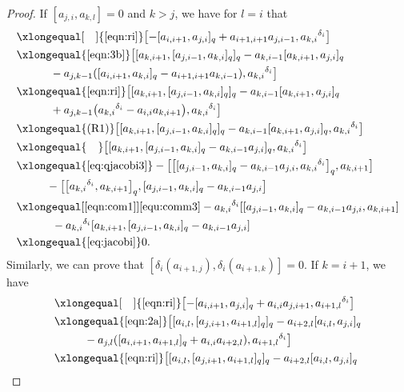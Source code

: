 \documentclass[pdftex]{sigma}
\numberwithin{equation}{section}
\def\lr#1{\left[#1\right]}
\def\d{\delta}
\begin{document}
\begin{proof}
If $\lr{a_{j,i}, a_{k,l}}=0$ and $k>j$, we have for $l=i$ that
 \begin{align*}
 [\d_i (a_{j,i}), \d_i(a_{k,i} ) ] &
 \xlongequal[\quad]{\eqref{eqn:ri}} \bigl[- [a_{i,i+1}, a_{j,i} ]_q+a_{i+1,i+1}a_{j,i-1}, {a_{k,i}}^{\d_i} \bigr] \\
 &\xlongequal{\eqref{eqn:3b}} \bigl[ [a_{k,i+1}, [a_{j,i-1}, a_{k,i} ]_q ]_q -a_{k,i-1} [a_{k,i+1}, a_{j,i} ]_q \\
 &\qquad \quad -a_{j,k-1} ( [a_{i,i+1}, a_{k,i} ]_q-a_{i+1,i+1}a_{k,i-1} ) , {a_{k,i}}^{\d_i} \bigr]\\
& \xlongequal{\eqref{eqn:ri}} \bigl[ [a_{k,i+1}, [a_{j,i-1}, a_{k,i} ]_q ]_q-a_{k,i-1} [a_{k,i+1}, a_{j,i} ]_q \\
 &\qquad \quad +a_{j,k-1} \bigl({a_{k,i}}^{\d_i}-a_{i,i}a_{k,i+1} \bigr) , {a_{k,i}}^{\d_i} \bigr] \\
 &\xlongequal{(\textrm{R1})} \bigl[ [a_{k,i+1}, [a_{j,i-1}, a_{k,i} ]_q ]_q-a_{k,i-1} [a_{k,i+1}, a_{j,i} ]_q, {a_{k,i}}^{\d_i} \bigr] \\
 & \xlongequal{\quad} \bigl[ [a_{k,i+1}, [a_{j,i-1}, a_{k,i} ]_q-a_{k,i-1}a_{j,i} ]_q, {a_{k,i}}^{\d_i} \bigr] \\
 &\xlongequal{\eqref{eq:qjacobi3}} - \bigl[ \bigl[ [a_{j,i-1}, a_{k,i} ]_q- a_{k,i-1}a_{j,i}, {a_{k,i}}^{\d_i} \bigr]_q, a_{k,i+1} \bigr] \\
 &\qquad\ \ - \bigl[ \bigl[{a_{k,i}}^{\d_i}, a_{k,i+1} \bigr]_q, [a_{j,i-1}, a_{k,i} ]_q-a_{k,i-1}a_{j,i} \bigr] \\
 &\xlongequal[\eqref{eqn:com1}]{\eqref{equ:comm3}} -{a_{k,i}}^{\d_i} [ [a_{j,i-1}, a_{k,i} ]_q-a_{k,i-1}a_{j,i}, a_{k,i+1} ] \\
 &\qquad\quad \, -{a_{k,i}}^{\d_i} [a_{k,i+1}, [a_{j,i-1}, a_{k,i} ]_q-a_{k,i-1}a_{j,i} ] \\
 &\xlongequal{\eqref{eq:jacobi}} 0.
 \end{align*}
Similarly, we can prove that
$[\d_i(a_{i+1,j}), \d_i(a_{i+1,k}) ]=0$.
If $k=i+1$, we have
 \begin{align*}
 [\d_i(a_{j,i}), \d_i(a_{i+1, l}) ]&
 \xlongequal[\quad]{\eqref{eqn:ri}} \bigl[- [a_{i,i+1}, a_{j,i} ]_q+a_{i,i}a_{j,i+1}, {a_{i+1,l}}^{\d_i} \bigr]\\
 &\xlongequal{\eqref{eqn:2a}} \bigl[ [a_{i,l}, [a_{j,i+1}, a_{i+1,l} ]_q ]_q-a_{i+2,l} [a_{i,l}, a_{j,i} ]_q \\
 &\qquad\ \ -a_{j,l} ( [a_{i,i+1}, a_{i+1,l} ]_q+a_{i,i}a_{i+2,l} ), {a_{i+1,l}}^{\d_i} \bigr] \\
 &\xlongequal{\eqref{eqn:ri}} \bigl[ [a_{i,l}, [a_{j,i+1}, a_{i+1,l} ]_q ]_q-a_{i+2,l} [a_{i,l}, a_{j,i} ]_q\\

\end{align*}
\end{proof}
\end{document}
